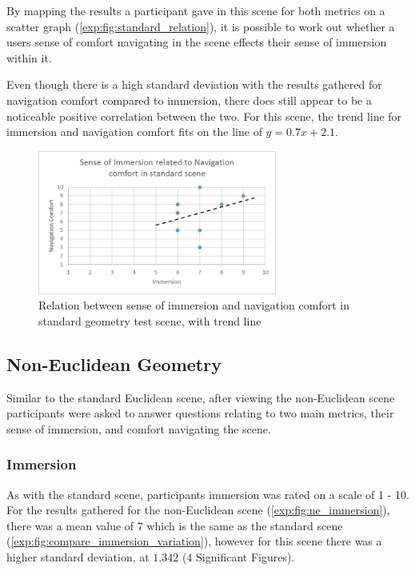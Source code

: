 				By mapping the results a participant gave in this scene for both metrics on a scatter graph (\autoref{exp:fig:standard_relation}), it is possible to work out whether a users sense of comfort navigating in the scene effects their sense of immersion within it.

				Even though there is a high standard deviation with the results gathered for navigation comfort compared to immersion, there does still appear to be a noticeable positive correlation between the two.
				For this scene, the trend line for immersion and navigation comfort fits on the line of $y = 0.7x + 2.1$.

				\begin{figure}[h]
					\includegraphics[width=0.7\textwidth]{Images/Standard_Relation}
					\centering
					\caption{Relation between sense of immersion and navigation comfort in standard geometry test scene, with trend line}
					\label{exp:fig:standard_relation}
				\end{figure}

		\subsection{Non-Euclidean Geometry}
		\label{exp:exp:ne}

			Similar to the standard Euclidean scene, after viewing the non-Euclidean scene participants were asked to answer questions relating to two main metrics, their sense of immersion, and comfort navigating the scene.

			\subsubsection{Immersion}

				As with the standard scene, participants immersion was rated on a scale of 1 - 10.
				For the results gathered for the non-Euclidean scene (\autoref{exp:fig:ne_immersion}), there was a mean value of $7$ which is the same as the standard scene (\autoref{exp:fig:compare_immersion_variation}), however for this scene there was a higher standard deviation, at $1.342$ (4 Significant Figures).

